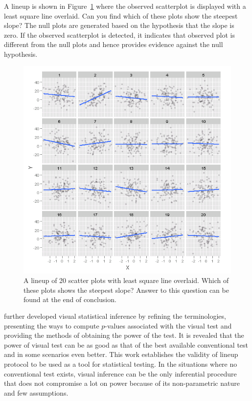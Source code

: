 \documentclass[11pt]{article}
\begin{document}
A lineup is shown in Figure~\ref{fig:lineup_turk} where the observed scatterplot is displayed with a least square line overlaid. Can you find which of these plots show the steepest slope? The null plots are generated based on the hypothesis that the slope is zero. If the observed scatterplot is detected, it indicates that observed plot is different from the null plots and hence provides evidence against the null hypothesis.

\begin{figure}[htbp] 
   \centering
   \includegraphics[width=6.5in]{plot_turk2_100_450_12_3.png} 
   \caption{A lineup of 20 scatter plots with least square line overlaid. Which of these plots shows the steepest slope? Answer to this question can be found at the end of conclusion.}
   \label{fig:lineup_turk}
\end{figure}


\cite{majumder:2013}  further developed visual statistical inference by refining the terminologies, presenting the ways to compute $p$-values associated with the visual test and providing the methods of obtaining the power of the test. It is revealed that the power of visual test  can be as good as that of the best available conventional test and in some scenarios even better. This work establishes the validity of lineup protocol to be used as a tool for statistical testing. In the situations where no conventional test exists, visual inference can be the only inferential procedure that does not compromise a lot on power because of its non-parametric nature and few assumptions. 
\end{document}

